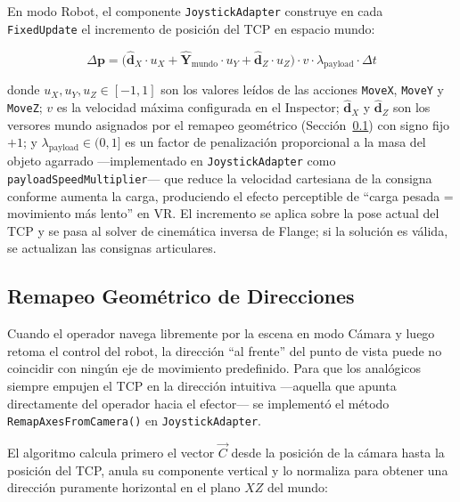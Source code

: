 \documentclass[12pt]{article}
\begin{document}
En modo Robot, el componente \texttt{JoystickAdapter} construye en cada \texttt{FixedUpdate} el incremento de posición del TCP en espacio mundo:

\begin{equation}
    \Delta\mathbf{p} = \bigl(\hat{\mathbf{d}}_X \cdot u_X
                           + \hat{\mathbf{Y}}_{\text{mundo}} \cdot u_Y
                           + \hat{\mathbf{d}}_Z \cdot u_Z\bigr)
                       \cdot v \cdot \lambda_{\text{payload}} \cdot \Delta t
    \label{eq:delta_p}
\end{equation}

donde $u_X, u_Y, u_Z \in [-1,1]$ son los valores leídos de las acciones \texttt{MoveX}, \texttt{MoveY} y \texttt{MoveZ}; $v$ es la velocidad máxima configurada en el Inspector; $\hat{\mathbf{d}}_X$ y $\hat{\mathbf{d}}_Z$ son los versores mundo asignados por el remapeo geométrico (Sección~\ref{sec:remap}) con signo fijo $+1$; y $\lambda_{\text{payload}} \in (0, 1]$ es un factor de penalización proporcional a la masa del objeto agarrado ---implementado en \texttt{JoystickAdapter} como \texttt{payloadSpeedMultiplier}--- que reduce la velocidad cartesiana de la consigna conforme aumenta la carga, produciendo el efecto perceptible de ``carga pesada = movimiento más lento'' en VR. El incremento se aplica sobre la pose actual del TCP y se pasa al solver de cinemática inversa de Flange; si la solución es válida, se actualizan las consignas articulares.

\subsection{Remapeo Geométrico de Direcciones}
\label{sec:remap}

Cuando el operador navega libremente por la escena en modo Cámara y luego retoma el control del robot, la dirección ``al frente'' del punto de vista puede no coincidir con ningún eje de movimiento predefinido. Para que los analógicos siempre empujen el TCP en la dirección intuitiva ---aquella que apunta directamente del operador hacia el efector--- se implementó el método \texttt{RemapAxesFromCamera()} en \texttt{JoystickAdapter}.

El algoritmo calcula primero el vector $\overrightarrow{C}$ desde la posición de la cámara hasta la posición del TCP, anula su componente vertical y lo normaliza para obtener una dirección puramente horizontal en el plano $XZ$ del mundo:
\end{document}
